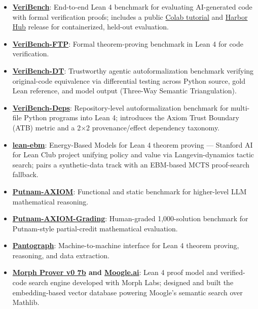\documentclass{article}
\newenvironment{changemargin}[2]{%
  \begin{list}{}{%
    \setlength{\topsep}{0pt}%
    \setlength{\leftmargin}{#1}%
    \setlength{\rightmargin}{#2}%
    \setlength{\listparindent}{\parindent}%
    \setlength{\itemindent}{\parindent}%
    \setlength{\parsep}{\parskip}%
  }%
  \item[]}{\end{list}
}
\newenvironment{body} {
		\vspace*{-16pt}
		\begin{changemargin}{-0.25in}{-0.5in}
	  }
		{\end{changemargin}\vspace{8pt plus 12pt}
	}
\begin{document}
\begin{body}
	\vspace{12pt}
	\begin{itemize} \itemsep -2pt
		\item \textbf{\href{https://openreview.net/forum?id=rWkGFmnSNl}{VeriBench}}: End-to-end Lean 4 benchmark for evaluating AI-generated code with formal verification proofs; includes a public \href{https://colab.research.google.com/drive/1_TsBPSQTMrNK0WD2-qj5VpEYKTLuiUYc?usp=sharing}{Colab tutorial} and \href{https://harborframework.com/registry}{Harbor Hub} release for containerized, held-out evaluation.
		\item \textbf{\href{https://openreview.net/forum?id=wDjOpXKgtU}{VeriBench-FTP}}: Formal theorem-proving benchmark in Lean 4 for code verification.
		\item \textbf{\href{https://github.com/brando90/veribench-inf}{VeriBench-DT}}: Trustworthy agentic autoformalization benchmark verifying original-code equivalence via differential testing across Python source, gold Lean reference, and model output (Three-Way Semantic Triangulation).
		\item \textbf{\href{https://github.com/brando90/veribench-deps}{VeriBench-Deps}}: Repository-level autoformalization benchmark for multi-file Python programs into Lean 4; introduces the Axiom Trust Boundary (ATB) metric and a 2$\times$2 provenance/effect dependency taxonomy.
		\item \textbf{\href{https://github.com/Stanford-AI-for-LEAN-Club/lean-ebm}{lean-ebm}}: Energy-Based Models for Lean 4 theorem proving --- Stanford AI for Lean Club project unifying policy and value via Langevin-dynamics tactic search; pairs a synthetic-data track with an EBM-based MCTS proof-search fallback.
		\item \textbf{\href{https://openreview.net/forum?id=kqj2Cn3Sxr}{Putnam-AXIOM}}: Functional and static benchmark for higher-level LLM mathematical reasoning.
		\item \textbf{\href{https://huggingface.co/datasets/3ricme/Putnam-AXIOM-Grading}{Putnam-AXIOM-Grading}}: Human-graded 1,000-solution benchmark for Putnam-style partial-credit mathematical evaluation.
		\item \textbf{\href{https://link.springer.com/chapter/10.1007/978-3-031-90643-5_6}{Pantograph}}: Machine-to-machine interface for Lean 4 theorem proving, reasoning, and data extraction.
		\item \textbf{\href{https://huggingface.co/morph-labs/morph-prover-v0-7b}{Morph Prover v0 7b} and \href{https://www.moogle.ai/}{Moogle.ai}}: Lean 4 proof model and verified-code search engine developed with Morph Labs; designed and built the embedding-based vector database powering Moogle's semantic search over Mathlib.

\end{itemize}
\end{body}
\end{document}
